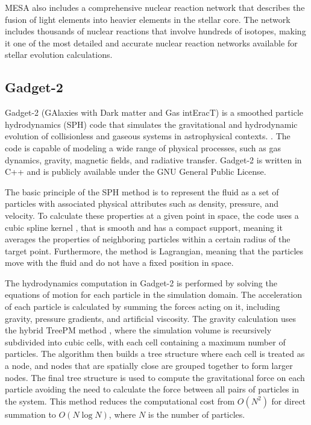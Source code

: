 MESA also includes a comprehensive nuclear reaction network that describes the fusion of light elements into heavier elements in the stellar core. The network includes thousands of nuclear reactions that involve hundreds of isotopes, making it one of the most detailed and accurate nuclear reaction networks available for stellar evolution calculations.


\subsection{Gadget-2}

Gadget-2 (GAlaxies with Dark matter and Gas intEracT) is a smoothed particle hydrodynamics (SPH) code that simulates the gravitational and hydrodynamic evolution of collisionless and gaseous systems in astrophysical contexts. \citep{springel2005cosmological}. The code is capable of modeling a wide range of physical processes, such as gas dynamics, gravity, magnetic fields, and radiative transfer. Gadget-2 is written in C++ and is publicly available under the GNU General Public License.

The basic principle of the SPH method is to represent the fluid as a set of particles with associated physical attributes such as density, pressure, and velocity. To calculate these properties at a given point in space, the code uses a cubic spline kernel \citep{monaghan1985refined}, that is smooth and has a compact support, meaning it averages the properties of neighboring particles within a certain radius of the target point. Furthermore, the method is Lagrangian, meaning that the particles move with the fluid and do not have a fixed position in space.


The hydrodynamics computation in Gadget-2 is performed by solving the equations of motion for each particle in the simulation domain. The acceleration of each particle is calculated by summing the forces acting on it, including gravity, pressure gradients, and artificial viscosity. The gravity calculation uses the hybrid TreePM method \citep{bode2000tree,bagla2002treepm}, where the simulation volume is recursively subdivided into cubic cells, with each cell containing a maximum number of particles. The algorithm then builds a tree structure where each cell is treated as a node, and nodes that are spatially close are grouped together to form larger nodes. The final tree structure is used to compute the gravitational force on each particle avoiding the need to calculate the force between all pairs of particles in the system. This method reduces the computational cost from $O(N^2)$ for direct summation to $O(N\log N)$, where $N$ is the number of particles.


